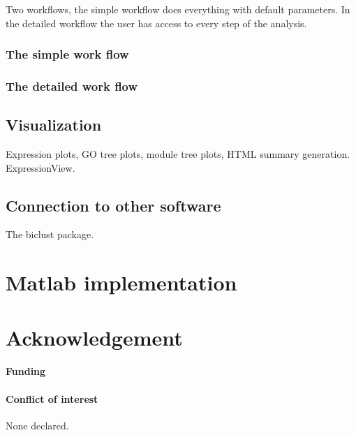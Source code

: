 \documentclass{bioinfo}
\begin{document}
Two workflows, the simple workflow does everything with default
parameters. In the detailed workflow the user has access to every step
of the analysis.

\subsubsection{The simple work flow}

\subsubsection{The detailed work flow} 

\subsection{Visualization}

Expression plots, GO tree plots, module tree plots, HTML summary
generation. ExpressionView.

\subsection{Connection to other software}

The biclust package.

\section{Matlab implementation}

\section*{Acknowledgement}

\paragraph{Funding\textcolon} 

\paragraph{Conflict of interest\textcolon} None declared.



\nocite{*}
\end{document}
